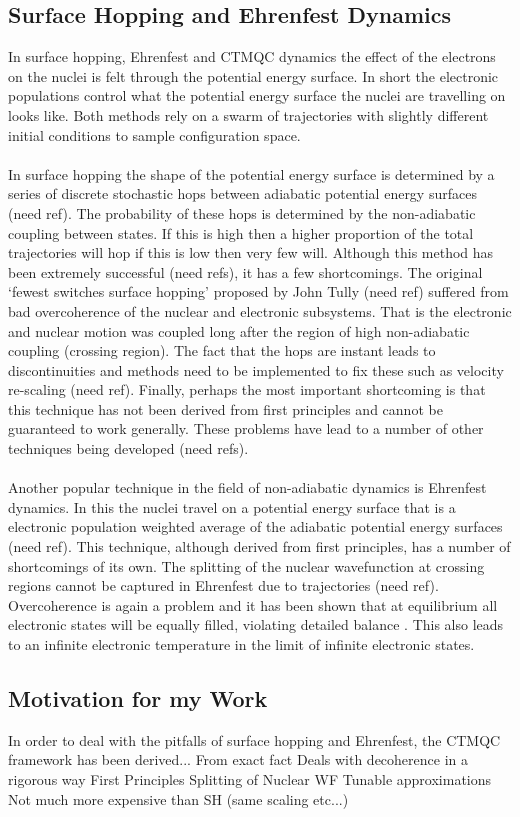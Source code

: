 \subsection{Surface Hopping and Ehrenfest Dynamics \label{sec:Ehren_SH}}
In surface hopping, Ehrenfest and CTMQC dynamics the effect of the electrons on the nuclei is felt through the potential energy surface. In short the electronic populations control what the potential energy surface the nuclei are travelling on looks like. Both methods rely on a swarm of trajectories with slightly different initial conditions to sample configuration space.
\\\\
In surface hopping the shape of the potential energy surface is determined by a series of discrete stochastic hops between adiabatic potential energy surfaces (need ref). The probability of these hops is determined by the non-adiabatic coupling between states. If this is high then a higher proportion of the total trajectories will hop if this is low then very few will. Although this method has been extremely successful (need refs), it has a few shortcomings. The original `fewest switches surface hopping' proposed by John Tully (need ref) suffered from bad overcoherence of the nuclear and electronic subsystems. That is the electronic and nuclear motion was coupled long after the region of high non-adiabatic coupling (crossing region). The fact that the hops are instant leads to discontinuities and methods need to be implemented to fix these such as velocity re-scaling (need ref). Finally, perhaps the most important shortcoming is that this technique has not been derived from first principles and cannot be guaranteed to work generally. These problems have lead to a number of other techniques being developed (need refs).
\\\\
Another popular technique in the field of non-adiabatic dynamics is Ehrenfest dynamics. In this the nuclei travel on a potential energy surface that is a electronic population weighted average of the adiabatic potential energy surfaces (need ref). This technique, although derived from first principles, has a number of shortcomings of its own. The splitting of the nuclear wavefunction at crossing regions cannot be captured in Ehrenfest due to trajectories  (need ref). Overcoherence is again a problem and it has been shown that at equilibrium all electronic states will be equally filled, violating detailed balance \cite{parandekar_detailed_2006}. This also leads to an infinite electronic temperature in the limit of infinite electronic states.

\subsection{Motivation for my Work}
In order to deal with the pitfalls of surface hopping and Ehrenfest, the CTMQC framework has been derived...
From exact fact
Deals with decoherence in a rigorous way
First Principles
Splitting of Nuclear WF
Tunable approximations
Not much more expensive than SH (same scaling etc...)
